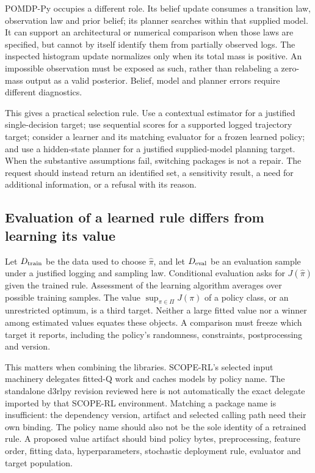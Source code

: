 POMDP-Py occupies a different role. Its belief update consumes a transition law,
observation law and prior belief; its planner searches within that supplied
model. It can support an architectural or numerical comparison when those laws
are specified, but cannot by itself identify them from partially observed logs.
The inspected histogram update normalizes only when its total mass is positive.
An impossible observation must be exposed as such, rather than relabeling a
zero-mass output as a valid posterior. Belief, model and planner errors require
different diagnostics.~\citep{exec23_pomdppy_sources}

This gives a practical selection rule. Use a contextual estimator for a justified
single-decision target; use sequential scores for a supported logged trajectory
target; consider a learner and its matching evaluator for a frozen learned policy;
and use a hidden-state planner for a justified supplied-model planning target.
When the substantive assumptions fail, switching packages is not a repair. The
request should instead return an identified set, a sensitivity result, a need for
additional information, or a refusal with its reason.

\subsection{Evaluation of a learned rule differs from learning its value}

Let $D_{\rm train}$ be the data used to choose $\widehat\pi$, and let
$D_{\rm eval}$ be an evaluation sample under a justified logging and sampling law.
Conditional evaluation asks for $J(\widehat\pi)$ given the trained rule. Assessment
of the learning algorithm averages over possible training samples. The value
$\sup_{\pi\in\Pi}J(\pi)$ of a policy class, or an unrestricted optimum, is a third
target. Neither a large fitted value nor a winner among estimated values equates
these objects. A comparison must freeze which target it reports, including the
policy's randomness, constraints, postprocessing and version.

This matters when combining the libraries. SCOPE-RL's selected input machinery
delegates fitted-Q work and caches models by policy name. The standalone d3rlpy
revision reviewed here is not automatically the exact delegate imported by that
SCOPE-RL environment. Matching a package name is insufficient: the dependency
version, artifact and selected calling path need their own binding. The policy
name should also not be the sole identity of a retrained rule. A proposed value
artifact should bind policy bytes, preprocessing, feature order, fitting data,
hyperparameters, stochastic deployment rule, evaluator and target population.
\citep{exec23_scope_rl_sources,exec15_d3rlpy_contract}

